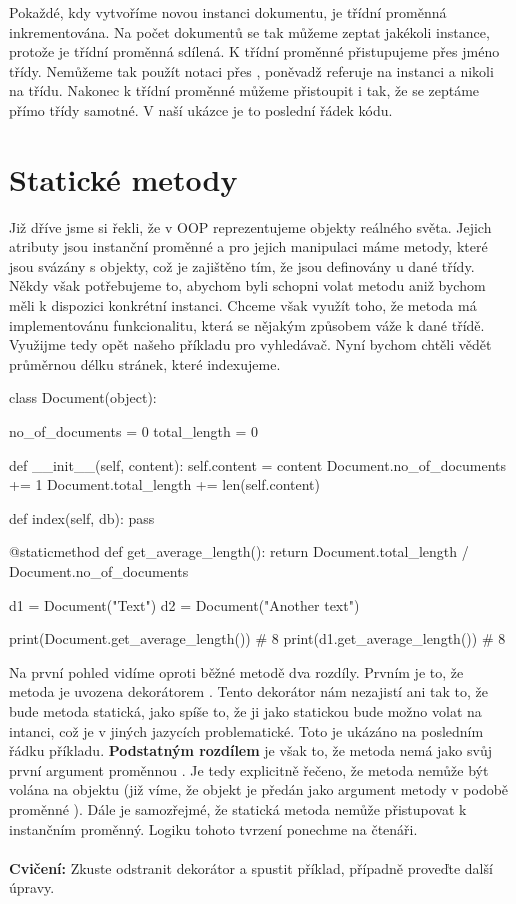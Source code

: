 Pokaždé, kdy vytvoříme novou instanci dokumentu, je třídní proměnná  inkrementována.
Na počet dokumentů se tak můžeme zeptat jakékoli instance, protože je třídní proměnná sdílená.
K třídní proměnné přistupujeme přes jméno třídy. Nemůžeme tak použít notaci přes ,
poněvadž  referuje na instanci a nikoli na třídu.
Nakonec k třídní proměnné můžeme přistoupit i tak, že se zeptáme přímo třídy samotné.
V naší ukázce je to poslední řádek kódu.

\section{Statické metody}

Již dříve jsme si řekli, že v OOP reprezentujeme objekty reálného světa. Jejich atributy jsou instanční
proměnné a pro jejich manipulaci máme metody, které jsou svázány s objekty, což je zajištěno tím, že
jsou definovány u dané třídy. Někdy však potřebujeme to, abychom byli schopni volat metodu aniž bychom
měli k dispozici konkrétní instanci. Chceme však využít toho, že metoda má implementovánu funkcionalitu,
která se nějakým způsobem váže k dané třídě. Využijme tedy opět našeho příkladu pro vyhledávač.
Nyní bychom chtěli vědět průměrnou délku stránek, které indexujeme.

\begin{python}
class Document(object):
    
    no_of_documents = 0
    total_length = 0

    def __init__(self, content):
        self.content = content
        Document.no_of_documents += 1
        Document.total_length += len(self.content)

    def index(self, db):
        pass

    @staticmethod
    def get_average_length():
        return Document.total_length / Document.no_of_documents

d1 = Document("Text")
d2 = Document("Another text")

print(Document.get_average_length()) # 8
print(d1.get_average_length()) # 8
\end{python}

Na první pohled vidíme oproti běžné metodě dva rozdíly. Prvním je to, že metoda je uvozena
dekorátorem . Tento dekorátor nám nezajistí ani tak
to, že bude metoda statická, jako spíše to, že ji jako statickou bude možno volat na intanci, což je
v jiných jazycích problematické. Toto je ukázáno na posledním řádku příkladu.
\textbf{Podstatným rozdílem} je však to, že metoda nemá jako svůj první
argument proměnnou . Je tedy explicitně řečeno, že metoda nemůže být volána na objektu (již
víme, že objekt je předán jako argument metody v podobě proměnné ). Dále je samozřejmé, že
statická metoda nemůže přistupovat k instančním proměnný. Logiku tohoto tvrzení ponechme na čtenáři.
\\
\\
\noindent
{\textbf{Cvičení:}}
Zkuste odstranit dekorátor a spustit příklad, případně proveďte další úpravy.


